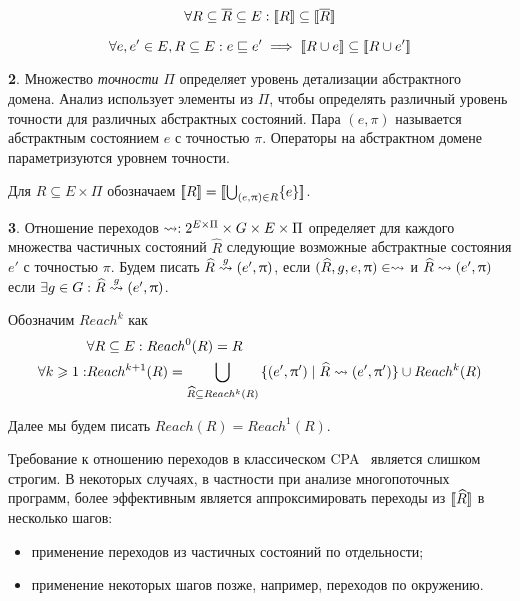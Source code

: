 \begin{equation}
\label{cpa_conc_eq_0}
\forall R \subseteq \overline{R} \subseteq E: [\![ R ]\!] \subseteq [\![ \overline R ]\!]
\end{equation}

\begin{equation}
\label{cpa_conc_eq_2}
\forall e, e' \in E, R \subseteq E : e \sqsubseteq e' \implies [\![ R \cup e ]\!] \subseteq [\![ R \cup e' ]\!]
\end{equation}

{\textbf 2.} Множество \emph{точности} $\Pi$ определяет уровень детализации абстрактного домена. Анализ использует элементы из $\Pi$, чтобы определять различный уровень точности для различных абстрактных состояний.
Пара $(e, \pi)$ называется абстрактным состоянием $e$ с точностью $\pi$.
Операторы на абстрактном домене параметризуются уровнем точности.

Для $R \subseteq E \times \Pi$ обозначаем
$[\![ R ]\!] = [\![ \bigcup_{(e,\uppi)\in R}\{e\} ]\!]$.

{\textbf 3.} Отношение переходов $\leadsto: 2^{E\times \Pi} \times G \times E \times \Pi$ определяет для каждого множества частичных состояний $\widehat{R}$ следующие возможные абстрактные состояния $e'$ с точностью $\pi$.
Будем писать $\widehat{R} \stackrel{g}{\leadsto} (e', \uppi)$, если $(\widehat{R}, g, e, \uppi) \in \leadsto$ и $\widehat{R} \leadsto (e', \uppi)$ если $\exists g \in G: \widehat{R} \stackrel{g}{\leadsto} (e', \uppi)$.


Обозначим $Reach^k$ как
\begin{equation}
\label{reach_k}
\begin{aligned}
& \forall R \subseteq E: Reach^0(R) = R \\
\forall k\geqslant 1:& Reach^{k+1}(R) = \bigcup_{\widehat{R} \subseteq Reach^{k}(R)}{\{(e',\uppi') \mid \widehat{R} \leadsto (e',\uppi')\}} \cup Reach^{k}(R) \\
\end{aligned}
\end{equation}

Далее мы будем писать $Reach(R) = Reach^1(R)$. 

Требование к отношению переходов в классическом CPA~\cite{Beyer08} является слишком строгим.
В некоторых случаях, в частности при анализе многопоточных программ, более эффективным является аппроксимировать переходы из $[\![ \widehat{R} ]\!]$  в несколько шагов:
\begin{itemize}
\item применение переходов из частичных состояний по отдельности;
\item применение некоторых шагов позже, например, переходов по окружению.
\end{itemize}

